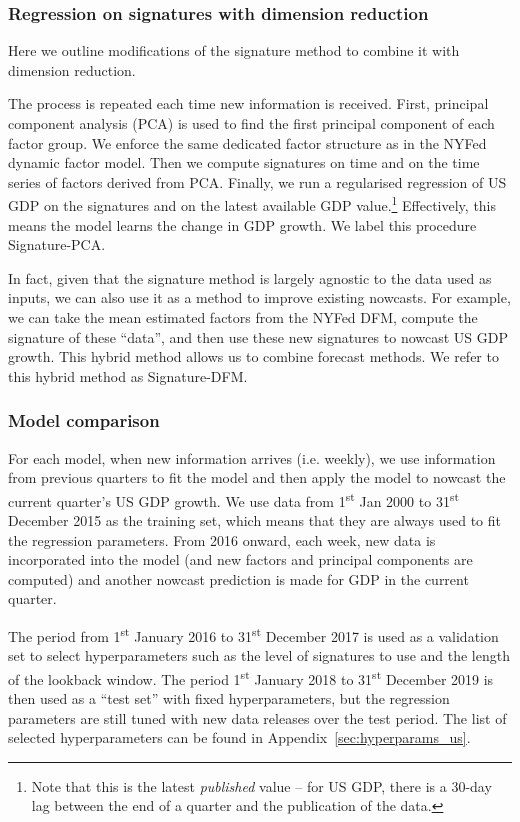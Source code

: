 \documentclass[a4paper, 12pt]{article}
\theoremstyle{remark}
\begin{document}
\subsubsection*{Regression on signatures with dimension reduction}
Here we outline modifications of the signature method to combine it with dimension reduction.

The process is repeated each time new information is received. First, principal component analysis (PCA) is used to find the first principal component of each factor group. We enforce the same dedicated factor structure as in the NYFed dynamic factor model. Then we compute signatures on time and on the time series of factors derived from PCA. Finally, we run a regularised regression of US GDP on the signatures and on the latest available GDP value.\footnote{Note that this is the latest \textit{published} value -- for US GDP, there is a 30-day lag between the end of a quarter and the publication of the data.} Effectively, this means the model learns the change in GDP growth. We label this procedure Signature-PCA.

In fact, given that the signature method is largely agnostic to the data used as inputs, we can also use it as a method to improve existing nowcasts. For example, we can take the mean estimated factors from the NYFed DFM, compute the signature of these ``data'', and then use these new signatures to nowcast US GDP growth. This hybrid method allows us to combine forecast methods. We refer to this hybrid method as Signature-DFM.

\subsubsection*{Model comparison}

For each model, when new information arrives (i.e. weekly), we use information from previous quarters to fit the model and then apply the model to nowcast the current quarter's US GDP growth. We use data from 1\textsuperscript{st} Jan 2000 to 31\textsuperscript{st} December 2015 as the training set, which means that they are always used to fit the regression parameters. 
From 2016 onward, each week, new data is incorporated into the model (and new factors and principal components are computed) and another nowcast prediction is made for GDP in the current quarter.

The period from 1\textsuperscript{st} January 2016 to 31\textsuperscript{st} December 2017 is used as a validation set to select hyperparameters such as the level of signatures to use and the length of the lookback window. The period 1\textsuperscript{st} January 2018 to 31\textsuperscript{st} December 2019 is then used as a ``test set'' with fixed hyperparameters, but the regression parameters are still tuned with new data releases over the test period. The list of selected hyperparameters can be found in Appendix~\ref{sec:hyperparams_us}.
\end{document}
